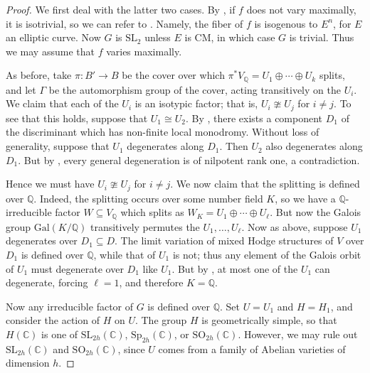 \documentclass[12pt]{amsart}
\newcommand{\Q}{\mathbb{Q}}
\newcommand{\C}{\mathbb{C}}
\newcommand{\Sp}{\mathrm{Sp}}
\newcommand{\SL}{\mathrm{SL}}
\theoremstyle{definition}
\numberwithin{equation}{section}
\begin{document}
\begin{proof}
We first deal with the latter two cases. By \cite{bakker25}, if \(f\) does not vary 
maximally, it is isotrivial, so we can refer to \cite{kim-laza-martin24}. Namely, 
the fiber of \(f\) is isogenous to \(E^n\), for \(E\) an elliptic curve. 
Now \(G\) is \(\SL_2\) unless \(E\) is CM, in which case \(G\) is trivial. Thus 
we may assume that \(f\) varies maximally. 

As before, take \(\pi: B' \to B\) be the cover over which 
\(\pi^* V_\Q = U_1 \oplus \cdots \oplus U_k\) splits, and let \(\Gamma\) be the automorphism 
group of the cover, acting transitively on the \(U_i\). We claim that each of the 
\(U_i\) is an isotypic factor; that is, \(U_i \ncong U_j\) for \(i \neq j\). To see that this holds,
suppose that \(U_1 \cong U_2\). By , there exists a component 
\(D_1\) of the discriminant which has non-finite local monodromy. Without loss of 
generality, suppose that \(U_1\) degenerates along \(D_1\). Then \(U_2\) also degenerates 
along \(D_1\). But by , every general degeneration is 
of nilpotent rank one, a contradiction.

Hence we must have \(U_i \ncong U_j\) for \(i \neq j\). We now claim that the 
splitting is defined over \(\Q\). Indeed, the splitting occurs over some number field 
\(K\), so we have a \(\Q\)-irreducible factor \(W \subseteq V_\Q\) which splits as 
\(W_K = U_1 \oplus \cdots \oplus U_\ell\). But now the Galois group \(\mathrm{Gal}(K/\Q)\) 
transitively permutes the \(U_1, \dots, U_\ell\). Now as above, suppose
\(U_1\) degenerates over \(D_1 \subseteq D\). The limit variation of mixed Hodge structures
of \(V\) over \(D_1\) is defined over \(\Q\), while that of \(U_1\) is not; thus 
any element of the Galois orbit of \(U_1\) must degenerate over \(D_1\) like \(U_1\).
But by , at most one of the \(U_1\) can degenerate, 
forcing \(\ell = 1\), and therefore \(K = \Q\).

Now any irreducible factor of \(G\) is defined over \(\Q\). Set \(U = U_1\) and \(H = H_1\),
and consider the action of \(H\) on \(U\). The group \(H\) is geometrically simple, 
so that \(H(\C)\) is one of \(\SL_{2h}(\C)\), \(\Sp_{2h}(\C)\), or \(\mathrm{SO}_{2h}(\C)\).
However, we may rule out \(\SL_{2h}(\C)\) and \(\mathrm{SO}_{2h}(\C)\), since 
\(U\) comes from a family of Abelian varieties of dimension \(h\).


\end{proof}
\end{document}
